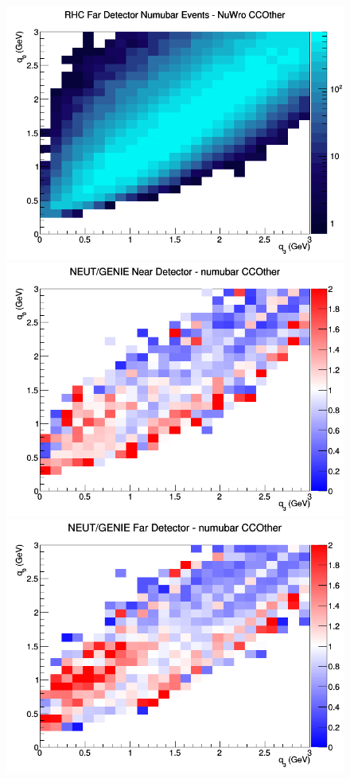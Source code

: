 \documentclass[12pt]{article}
\begin{document}
\begin{figure}[h]
\endminipage
{}
\includegraphics[width=\linewidth]{eff_q0_q3/FGT/CCOther_RHC_FD_numubar_q3_q0_NuWro.png}
\endminipage
\newline
{}
\includegraphics[width=\linewidth]{eff_q0_q3/FGT/ratios/CCOther_NEUT_GENIE_numubar_near_q3_q0.png}
\endminipage
{}
\includegraphics[width=\linewidth]{eff_q0_q3/FGT/ratios/CCOther_NEUT_GENIE_numubar_far_q3_q0.png}

\end{figure}
\end{document}
